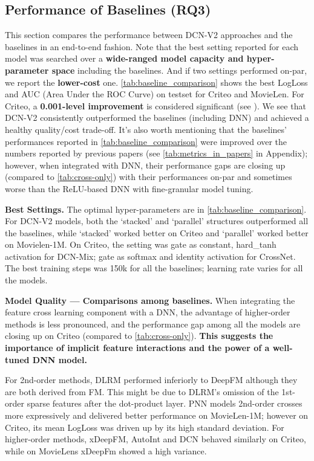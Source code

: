 \documentclass[sigconf]{acmart}
\begin{document}
\subsection{Performance of Baselines (RQ3)}
\label{sec:performance_baselines}
This section compares the performance between {DCN-V2} approaches and the baselines in an end-to-end fashion. Note that the best setting reported for each model was searched over a {\bf wide-ranged model capacity and hyper-parameter space} including the baselines. And if two settings performed on-par, we report the {\bf lower-cost} one. \autoref{tab:baseline_comparison} shows the best LogLoss and AUC (Area Under the ROC Curve) on testset for Criteo and MovieLen. For Criteo, a {\bf 0.001-level improvement} is considered significant (see \cite{song2019autoint, wang2017deep, guo2017deepfm}).  We see that {DCN-V2} consistently outperformed the baselines (including DNN) and achieved a healthy quality/cost trade-off. It's also worth mentioning that the baselines' performances reported in \autoref{tab:baseline_comparison} were improved over the numbers reported by previous papers (see \autoref{tab:metrics_in_papers} in Appendix); however, when integrated with DNN, their performance gaps are closing up (compared to \autoref{tab:cross-only}) with their performances on-par and sometimes worse than the ReLU-based DNN with fine-granular model tuning.

{\bf Best Settings.} The optimal hyper-parameters are in \autoref{tab:baseline_comparison}. For {DCN-V2} models, both the `stacked' and `parallel' structures outperformed all the baselines, while `stacked' worked better on Criteo and `parallel' worked better on Movielen-1M. On Criteo, the setting was gate as constant, hard\_tanh activation for {DCN-Mix}; gate as softmax and identity activation for CrossNet. The best training steps was 150k for all the baselines; learning rate varies for all the models.



{\bf Model Quality --- Comparisons among baselines.} When integrating the feature cross learning component with a DNN, the advantage of higher-order methods is less pronounced, and the performance gap among all the models are closing up on Criteo (compared to \autoref{tab:cross-only}). \textbf{This suggests the importance of implicit feature interactions and the power of a well-tuned DNN model.}

For 2nd-order methods, DLRM performed inferiorly to DeepFM although they are both derived from FM. This might be due to DLRM's omission of the 1st-order sparse features after the dot-product layer. PNN models 2nd-order crosses more expressively and delivered better performance on MovieLen-1M; however on Criteo, its mean LogLoss was driven up by its high standard deviation. For higher-order methods, xDeepFM, AutoInt and DCN behaved similarly on Criteo, while on MovieLens xDeepFm showed a high variance.
\end{document}
